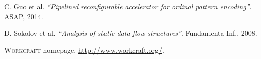 \documentclass[conference]{IEEEtran}
\begin{document}
\begin{thebibliography}{3}
\scriptsize
{}
	C. Guo et al.
	\emph{``Pipelined reconfigurable accelerator for ordinal pattern encoding''}.
	ASAP, 2014.

	D. Sokolov et al. \emph{``Analysis of static data flow structures''}.
	Fundamenta Inf., 2008.

	\textsc{Workcraft} homepage. \url{http://www.workcraft.org/}.	

\end{thebibliography}
\end{document}
